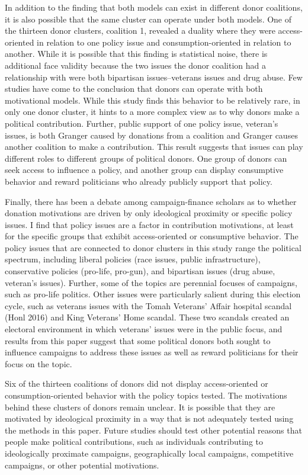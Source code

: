 \documentclass[12pt,]{article}
\begin{document}
In addition to the finding that both models can exist in different donor
coalitions, it is also possible that the same cluster can operate under
both models. One of the thirteen donor clusters, coalition 1, revealed a
duality where they were access-oriented in relation to one policy issue
and consumption-oriented in relation to another. While it is possible
that this finding is statistical noise, there is additional face
validity because the two issues the donor coalition had a relationship
with were both bipartisan issues--veterans issues and drug abuse. Few
studies have come to the conclusion that donors can operate with both
motivational models. While this study finds this behavior to be
relatively rare, in only one donor cluster, it hints to a more complex
view as to why donors make a political contribution. Further, public
support of one policy issue, veteran's issues, is both Granger caused by
donations from a coalition and Granger causes another coalition to make
a contribution. This result suggests that issues can play different
roles to different groups of political donors. One group of donors can
seek access to influence a policy, and another group can display
consumptive behavior and reward politicians who already publicly support
that policy.

Finally, there has been a debate among campaign-finance scholars as to
whether donation motivations are driven by only ideological proximity or
specific policy issues. I find that policy issues are a factor in
contribution motivations, at least for the specific groups that exhibit
access-oriented or consumptive behavior. The policy issues that are
connected to donor clusters in this study range the political spectrum,
including liberal policies (race issues, public infrastructure),
conservative policies (pro-life, pro-gun), and bipartisan issues (drug
abuse, veteran's issues). Further, some of the topics are perennial
focuses of campaigns, such as pro-life politics. Other issues were
particularly salient during this election cycle, such as veterans issues
with the Tomah Veterans' Affair hospital scandal (Honl 2016) and King
Veterans' Home scandal. These two scandals created an electoral
environment in which veterans' issues were in the public focus, and
results from this paper suggest that some political donors both sought
to influence campaigns to address these issues as well as reward
politicians for their focus on the topic.

Six of the thirteen coalitions of donors did not display access-oriented
or consumption-oriented behavior with the policy topics tested. The
motivations behind these clusters of donors remain unclear. It is
possible that they are motivated by ideological proximity in a way that
is not adequately tested using the methods in this paper. Future studies
should test other potential reasons that people make political
contributions, such as individuals contributing to ideologically
proximate campaigns, geographically local campaigns, competitive
campaigns, or other potential motivations.
\end{document}
